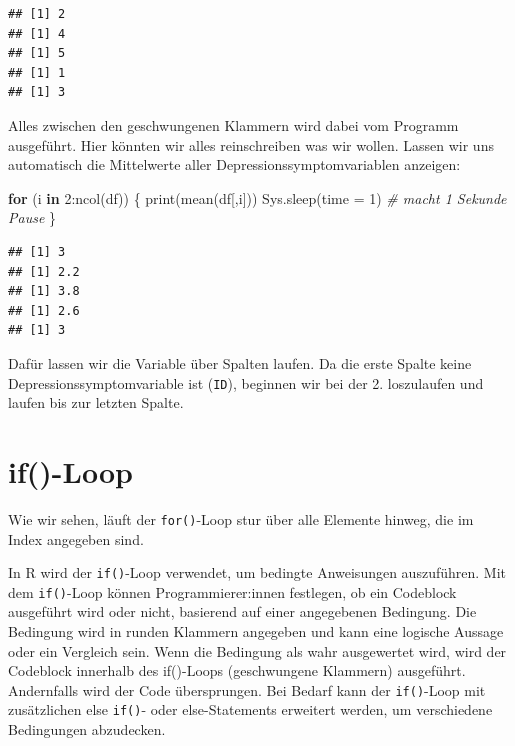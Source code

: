 \documentclass[
]{book}
\newenvironment{Shaded}{\begin{snugshade}}{\end{snugshade}}
\newcommand{\AttributeTok}[1]{\textcolor[rgb]{0.77,0.63,0.00}{#1}}
\newcommand{\CommentTok}[1]{\textcolor[rgb]{0.56,0.35,0.01}{\textit{#1}}}
\newcommand{\ControlFlowTok}[1]{\textcolor[rgb]{0.13,0.29,0.53}{\textbf{#1}}}
\newcommand{\DecValTok}[1]{\textcolor[rgb]{0.00,0.00,0.81}{#1}}
\newcommand{\FunctionTok}[1]{\textcolor[rgb]{0.00,0.00,0.00}{#1}}
\newcommand{\NormalTok}[1]{#1}
\newcommand{\SpecialCharTok}[1]{\textcolor[rgb]{0.00,0.00,0.00}{#1}}
\begin{document}
\begin{Shaded}
\end{Shaded}

\begin{verbatim}
## [1] 2
## [1] 4
## [1] 5
## [1] 1
## [1] 3
\end{verbatim}

Alles zwischen den geschwungenen Klammern wird dabei vom Programm ausgeführt. Hier könnten wir alles reinschreiben was wir wollen. Lassen wir uns automatisch die Mittelwerte aller Depressionssymptomvariablen anzeigen:

\begin{Shaded}
\begin{Highlighting}[]
\ControlFlowTok{for}\NormalTok{ (i }\ControlFlowTok{in} \DecValTok{2}\SpecialCharTok{:}\FunctionTok{ncol}\NormalTok{(df)) \{}
  \FunctionTok{print}\NormalTok{(}\FunctionTok{mean}\NormalTok{(df[,i]))}
  \FunctionTok{Sys.sleep}\NormalTok{(}\AttributeTok{time =} \DecValTok{1}\NormalTok{) }\CommentTok{\# macht 1 Sekunde Pause}
\NormalTok{\}}
\end{Highlighting}
\end{Shaded}

\begin{verbatim}
## [1] 3
## [1] 2.2
## [1] 3.8
## [1] 2.6
## [1] 3
\end{verbatim}

Dafür lassen wir die Variable über Spalten laufen. Da die erste Spalte keine Depressionssymptomvariable ist (\texttt{ID}), beginnen wir bei der 2. loszulaufen und laufen bis zur letzten Spalte.

\hypertarget{if-loop}{%
\section{if()-Loop}\label{if-loop}}

Wie wir sehen, läuft der \texttt{for()}-Loop stur über alle Elemente hinweg, die im Index angegeben sind.

In R wird der \texttt{if()}-Loop verwendet, um bedingte Anweisungen auszuführen. Mit dem \texttt{if()}-Loop können Programmierer:innen festlegen, ob ein Codeblock ausgeführt wird oder nicht, basierend auf einer angegebenen Bedingung. Die Bedingung wird in runden Klammern angegeben und kann eine logische Aussage oder ein Vergleich sein. Wenn die Bedingung als wahr ausgewertet wird, wird der Codeblock innerhalb des if()-Loops (geschwungene Klammern) ausgeführt. Andernfalls wird der Code übersprungen. Bei Bedarf kann der \texttt{if()}-Loop mit zusätzlichen else \texttt{if()}- oder else-Statements erweitert werden, um verschiedene Bedingungen abzudecken.
\end{document}
